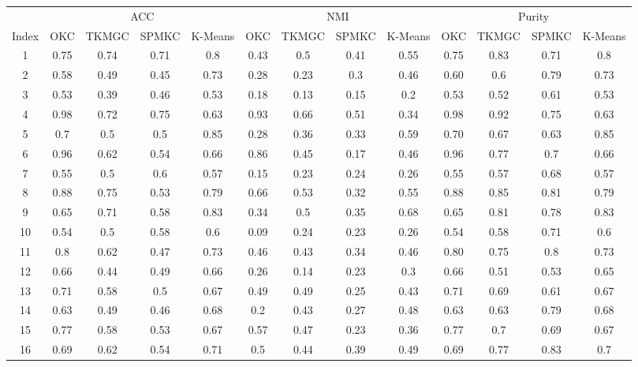 \documentclass[10pt,final]{IEEEtran}
\begin{document}
\begin{center}
\begin{table}[h!]
\begin{tabular}{|c|c|c|c|c|c|c|c|c|c|c|c|c|}
   \hline
   \multicolumn{1}{|c|}{}&\multicolumn{4}{|c|}{ACC} & \multicolumn{4}{|c|}{NMI} & \multicolumn{4}{|c|}{Purity}\\
   \cline{2-13}
   Index & OKC & TKMGC & SPMKC & K-Means & OKC & TKMGC & SPMKC & K-Means & OKC & TKMGC & SPMKC & K-Means \\
   \hline
   1 & 0.75	&	0.74	&	0.71	&	0.8	&	0.43	&	0.5	&	0.41	&	0.55	&	 0.75	&	0.83	&	0.71	&	0.8\\
	2 & 0.58	&	0.49	&	0.45	&	0.73	&	0.28	&	0.23	&	0.3	&	0.46	&	 0.60 	&	0.6	&	0.79	&	0.73\\
	3 & 0.53	&	0.39	&	0.46	&	0.53	&	0.18	&	0.13	&	0.15	&	0.2	&	 0.53 	&	0.52	&	0.61	&	0.53\\
	4 & 0.98	&	0.72	&	0.75	&	0.63	&	0.93	&	0.66	&	0.51	&	0.34	&	 0.98 	&	0.92	&	0.75	&	0.63\\
	5 & 0.7	&	0.5	&	0.5	&	0.85	&	0.28	&	0.36	&	0.33	&	0.59	&	 0.70 	&	0.67	&	0.63	&	0.85\\
	6 & 0.96	&	0.62	&	0.54	&	0.66	&	0.86	&	0.45	&	0.17	&	0.46	&	 0.96 	&	0.77	&	0.7	&	0.66\\
	7 & 0.55	&	0.5	&	0.6	&	0.57	&	0.15	&	0.23	&	0.24	&	0.26	&	 0.55 	&	0.57	&	0.68	&	0.57\\
	8 & 0.88	&	0.75	&	0.53	&	0.79	&	0.66	&	0.53	&	0.32	&	0.55	&	 0.88	&	0.85	&	0.81	&	0.79\\
	9 & 0.65	&	0.71	&	0.58	&	0.83	&	0.34	&	0.5	&	0.35	&	0.68	&	 0.65	&	0.81	&	0.78	&	0.83\\
	10 & 0.54	&	0.5	&	0.58	&	0.6	&	0.09	&	0.24	&	0.23	&	0.26	&	 0.54	&	0.58	&	0.71	&	0.6\\
	11 & 0.8	&	0.62	&	0.47	&	0.73	&	0.46	&	0.43	&	0.34	&	0.46	&	 0.80	&	0.75	&	0.8	&	0.73\\
	12 & 0.66	&	0.44	&	0.49	&	0.66	&	0.26	&	0.14	&	0.23	&	0.3	&	 0.66	&	0.51	&	0.53	&	0.65\\
	13 & 0.71	&	0.58	&	0.5	&	0.67	&	0.49	&	0.49	&	0.25	&	0.43	&	 0.71	&	0.69	&	0.61	&	0.67\\
	14 & 0.63	&	0.49	&	0.46	&	0.68	&	0.2	&	0.43	&	0.27	&	0.48	&	 0.63	&	0.63	&	0.79	&	0.68\\
	15 & 0.77	&	0.58	&	0.53	&	0.67	&	0.57	&	0.47	&	0.23	&	0.36	&	 0.77	&	0.7	&	0.69	&	0.67\\
	16 & 0.69	&	0.62	&	0.54	&	0.71	&	0.5	&	0.44	&	0.39	&	0.49	&	 0.69	&	0.77	&	0.83	&	0.7\\

\end{tabular}
\end{table}
\end{center}
\end{document}
